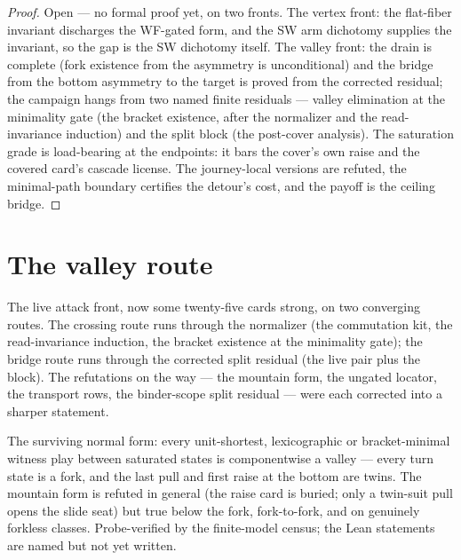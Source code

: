 \begin{proof}
Open --- no formal proof yet, on two fronts.  The vertex front:
the flat-fiber invariant discharges the WF-gated form, and the SW
arm dichotomy supplies the invariant, so the gap is the SW
dichotomy itself.  The valley front: the drain is complete (fork
existence from the asymmetry is unconditional) and the bridge
from the bottom asymmetry to the target is proved from the
corrected residual; the campaign hangs from two named finite
residuals --- valley elimination at the minimality gate (the
bracket existence, after the normalizer and the read-invariance
induction) and the split block (the post-cover analysis).  The saturation grade is
load-bearing at the endpoints: it bars the cover's own raise and
the covered card's cascade license.  The journey-local versions
are refuted, the minimal-path boundary certifies the detour's
cost, and the payoff is the ceiling bridge.
\end{proof}

\section{The valley route}

The live attack front, now some twenty-five cards strong, on two
converging routes.  The crossing route runs through the normalizer
(the commutation kit, the read-invariance induction, the bracket
existence at the minimality gate); the bridge route runs through
the corrected split residual (the live pair plus the block).  The
refutations on the way --- the mountain form, the ungated
locator, the transport rows, the binder-scope split residual ---
were each corrected into a sharper statement.

\begin{theorem}\label{thm:valleyForm}
The surviving normal form: every unit-shortest, lexicographic or
bracket-minimal witness play between saturated states is
componentwise a valley --- every turn state is a fork, and the
last pull and first raise at the bottom are twins.  The mountain
form is refuted in general (the raise card is buried; only a
twin-suit pull opens the slide seat) but true below the fork,
fork-to-fork, and on genuinely forkless classes.  Probe-verified
by the finite-model census; the Lean statements are named but
not yet written.
\end{theorem}

